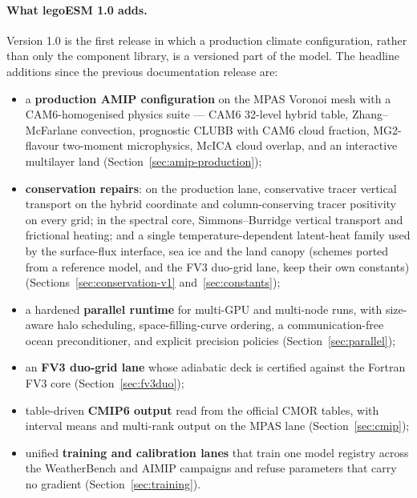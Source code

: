 \documentclass[11pt,a4paper]{article}
\begin{document}
\paragraph{What legoESM 1.0 adds.}
Version 1.0 is the first release in which a production climate configuration, rather than only the component library, is a versioned part of the model.  The headline additions since the previous documentation release are:
\begin{itemize}[nosep]
  \item a \textbf{production AMIP configuration} on the MPAS Voronoi mesh with a CAM6-homogenised physics suite --- CAM6 32-level hybrid table, Zhang--McFarlane convection, prognostic CLUBB with CAM6 cloud fraction, MG2-flavour two-moment microphysics, McICA cloud overlap, and an interactive multilayer land (Section~\ref{sec:amip-production});
  \item \textbf{conservation repairs}: on the production lane, conservative tracer vertical transport on the hybrid coordinate and column-conserving tracer positivity on every grid; in the spectral core, Simmons--Burridge vertical transport and frictional heating; and a single temperature-dependent latent-heat family used by the surface-flux interface, sea ice and the land canopy (schemes ported from a reference model, and the FV3 duo-grid lane, keep their own constants) (Sections~\ref{sec:conservation-v1} and~\ref{sec:constants});
  \item a hardened \textbf{parallel runtime} for multi-GPU and multi-node runs, with size-aware halo scheduling, space-filling-curve ordering, a communication-free ocean preconditioner, and explicit precision policies (Section~\ref{sec:parallel});
  \item an \textbf{FV3 duo-grid lane} whose adiabatic deck is certified against the Fortran FV3 core (Section~\ref{sec:fv3duo});
  \item table-driven \textbf{CMIP6 output} read from the official CMOR tables, with interval means and multi-rank output on the MPAS lane (Section~\ref{sec:cmip});
  \item unified \textbf{training and calibration lanes} that train one model registry across the WeatherBench and AIMIP campaigns and refuse parameters that carry no gradient (Section~\ref{sec:training}).
\end{itemize}
\end{document}
